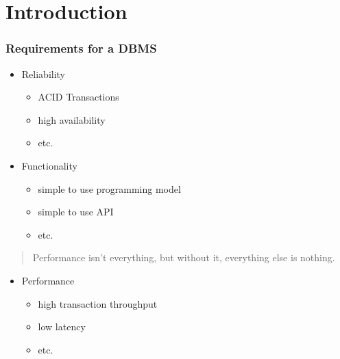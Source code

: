 \section[Introduction]{Introduction} \label{sec_intro}

\begin{frame}
	\sectionpage
\end{frame}

\begin{frame}
	
    \frametitle{Requirements for a DBMS}
    
    \begin{itemize}
    	\item Reliability
              \begin{itemize}
                  \item ACID Transactions
                  \item high availability
                  \item etc.
              \end{itemize}
        \item Functionality
              \begin{itemize}
                  \item simple to use programming model
                  \item simple to use API
                  \item etc.
              \end{itemize}
    \end{itemize}
    
    \begin{quote}
       	\small \noindent Performance isn't everything, but without it, everything else is nothing.
    \end{quote}
    
    \begin{itemize}
    	\item Performance
        	  \begin{itemize}
        	          \item high transaction throughput
                  \item low latency
                  \item etc.
        	  \end{itemize}
    \end{itemize}
    
\end{frame}

